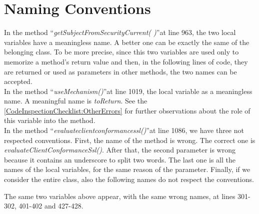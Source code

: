 \documentclass[\mainpath/main]{subfiles}
\begin{document}
\section{Naming Conventions}
\label{CodeInspectionChecklist:NamingConventions}
In the method \textquotedblleft \textit{getSubjectFromSecurityCurrent( )}\textquotedblright at line 963, the two local variables have a meaningless name. A better one can be exactly the same of the belonging class.
To be more precise, since this two variables are used only to memorize a method's return value and then, in the following lines of code, they are returned or used as parameters in other methods, the two names can be accepted.\\
In the method \textquotedblleft \textit{useMechanism(\textellipsis)}\textquotedblright at line 1019, the local variable as a meaningless name. A meaningful name is \textit{toReturn}.
See the \autoref{CodeInspectionChecklist:OtherErrors} for further observations about the role of this variable into the method.\\
In the method \textquotedblleft \textit{evaluate\textunderscore client\textunderscore conformance\textunderscore ssl(\textellipsis)}\textquotedblright at line 1086, we have three not respected conventions. First, the name of the method is wrong. The correct one is \textit{evaluateClientConformanceSsl(\textellipsis)}. After that, the second parameter is wrong because it contains an underscore to split two words.
The last one is all the names of the local variables, for the same reason of the parameter.
Finally, if we consider the entire class, also the following names do not respect the conventions.
\begin{scriptsize}
	\centerline{The same two variables above appear, with the same wrong names, at lines 301-302, 401-402 and 427-428.}
\end{scriptsize}
\end{document}
